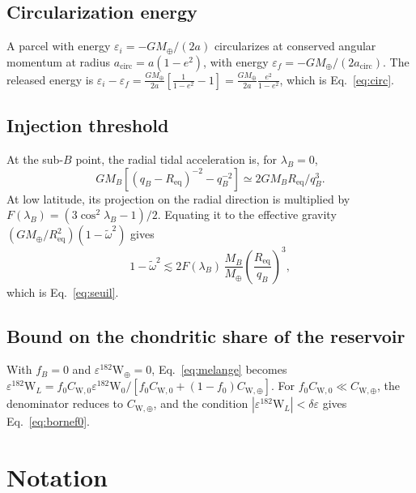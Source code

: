 \documentclass[11pt,a4paper,openany]{report}
\newcommand{\Mt}{M_{\oplus}}
\newcommand{\Req}{R_{\mathrm{eq}}}
\begin{document}
\section{Circularization energy}

A parcel with energy $\varepsilon_i=-G\Mt/(2a)$ circularizes at conserved angular momentum at radius
$a_{\mathrm{circ}}=a(1-e^2)$, with energy $\varepsilon_f=-G\Mt/(2a_{\mathrm{circ}})$. The released
energy is
$\varepsilon_i-\varepsilon_f=\frac{G\Mt}{2a}\left[\frac{1}{1-e^2}-1\right]=\frac{G\Mt}{2a}\frac{e^2}{1-e^2}$,
which is Eq.~\eqref{eq:circ}.

\section{Injection threshold}

At the sub-$B$ point, the radial tidal acceleration is, for $\lambda_B=0$,
\begin{equation}
GM_B\left[(q_B-\Req)^{-2}-q_B^{-2}\right]\simeq2GM_B\Req/q_B^3.
\end{equation}
At low latitude, its projection on the radial direction is multiplied by
$F(\lambda_B)=(3\cos^2\lambda_B-1)/2$. Equating it to the effective gravity
$(G\Mt/\Req^2)(1-\tilde\omega^2)$ gives
\begin{equation}
1-\tilde\omega^2\lesssim2F(\lambda_B)\,\frac{M_B}{\Mt}\left(\frac{\Req}{q_B}\right)^3,
\end{equation}
which is Eq.~\eqref{eq:seuil}.

\section{Bound on the chondritic share of the reservoir}
\label{app:borneW}

With $f_B=0$ and $\varepsilon^{182}\mathrm{W}_\oplus=0$, Eq.~\eqref{eq:melange} becomes
$\varepsilon^{182}\mathrm{W}_L=f_0C_{\mathrm{W},0}\varepsilon^{182}\mathrm{W}_0/
[f_0C_{\mathrm{W},0}+(1-f_0)C_{\mathrm{W},\oplus}]$. For
$f_0C_{\mathrm{W},0}\ll C_{\mathrm{W},\oplus}$, the denominator reduces to $C_{\mathrm{W},\oplus}$,
and the condition $|\varepsilon^{182}\mathrm{W}_L|<\delta\varepsilon$ gives
Eq.~\eqref{eq:bornef0}.

\chapter{Notation}
\label{app:notations}
\end{document}
